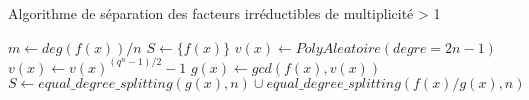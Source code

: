 \begin{algorithm}
  \caption{Algorithme de séparation des facteurs irr\'eductibles de multiplicité > 1}
  \begin{algorithmic}[1]
    \Statex
        \State {}
      \EndIf
      \State $m \gets deg(f(x))/n $
      \State $S \gets \{f(x)\}$
        \State $v(x) \gets PolyAleatoire(degre=2n-1)$
        \State $v(x) \gets v(x)^{(q^n-1)/2}-1$
        \State $g(x) \gets gcd(f(x), v(x))$
          \State $S \gets equal\_degree\_splitting(g(x), n) \cup equal\_degree\_splitting(f(x)/g(x), n)$
        \EndIf
      \EndWhile
      \State {}
    \EndFunction
  \end{algorithmic}
\end{algorithm}
